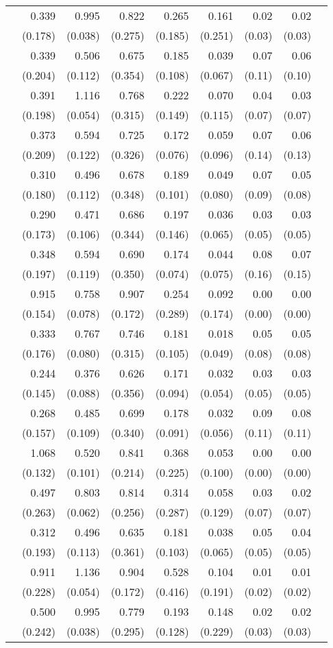 \begin{longtable}{rrrrrrrrr}
\addlinespace[0.05cm] 16&0.339&0.995&0.822&0.265&0.161&0.02&0.02\\&(0.178)&(0.038)&(0.275)&(0.185)&(0.251)&(0.03)&(0.03) \\ \addlinespace[0.05cm] 17&0.339&0.506&0.675&0.185&0.039&0.07&0.06\\&(0.204)&(0.112)&(0.354)&(0.108)&(0.067)&(0.11)&(0.10) \\ \addlinespace[0.05cm] 18&0.391&1.116&0.768&0.222&0.070&0.04&0.03\\&(0.198)&(0.054)&(0.315)&(0.149)&(0.115)&(0.07)&(0.07) \\ \addlinespace[0.05cm] 19&0.373&0.594&0.725&0.172&0.059&0.07&0.06\\&(0.209)&(0.122)&(0.326)&(0.076)&(0.096)&(0.14)&(0.13) \\ \addlinespace[0.05cm] 20&0.310&0.496&0.678&0.189&0.049&0.07&0.05\\&(0.180)&(0.112)&(0.348)&(0.101)&(0.080)&(0.09)&(0.08) \\ \addlinespace[0.05cm] 21&0.290&0.471&0.686&0.197&0.036&0.03&0.03\\&(0.173)&(0.106)&(0.344)&(0.146)&(0.065)&(0.05)&(0.05) \\ \addlinespace[0.05cm] 22&0.348&0.594&0.690&0.174&0.044&0.08&0.07\\&(0.197)&(0.119)&(0.350)&(0.074)&(0.075)&(0.16)&(0.15) \\ \addlinespace[0.05cm] 23&0.915&0.758&0.907&0.254&0.092&0.00&0.00\\&(0.154)&(0.078)&(0.172)&(0.289)&(0.174)&(0.00)&(0.00) \\ \addlinespace[0.05cm] 24&0.333&0.767&0.746&0.181&0.018&0.05&0.05\\&(0.176)&(0.080)&(0.315)&(0.105)&(0.049)&(0.08)&(0.08) \\ \addlinespace[0.05cm] 25&0.244&0.376&0.626&0.171&0.032&0.03&0.03\\&(0.145)&(0.088)&(0.356)&(0.094)&(0.054)&(0.05)&(0.05) \\ \addlinespace[0.05cm] 26&0.268&0.485&0.699&0.178&0.032&0.09&0.08\\&(0.157)&(0.109)&(0.340)&(0.091)&(0.056)&(0.11)&(0.11) \\ \addlinespace[0.05cm] 27&1.068&0.520&0.841&0.368&0.053&0.00&0.00\\&(0.132)&(0.101)&(0.214)&(0.225)&(0.100)&(0.00)&(0.00) \\ \addlinespace[0.05cm] 28&0.497&0.803&0.814&0.314&0.058&0.03&0.02\\&(0.263)&(0.062)&(0.256)&(0.287)&(0.129)&(0.07)&(0.07) \\ \addlinespace[0.05cm] 29&0.312&0.496&0.635&0.181&0.038&0.05&0.04\\&(0.193)&(0.113)&(0.361)&(0.103)&(0.065)&(0.05)&(0.05) \\ \addlinespace[0.05cm] 30&0.911&1.136&0.904&0.528&0.104&0.01&0.01\\&(0.228)&(0.054)&(0.172)&(0.416)&(0.191)&(0.02)&(0.02) \\ \addlinespace[0.05cm] 31&0.500&0.995&0.779&0.193&0.148&0.02&0.02\\&(0.242)&(0.038)&(0.295)&(0.128)&(0.229)&(0.03)&(0.03) \\ 
\end{longtable}
